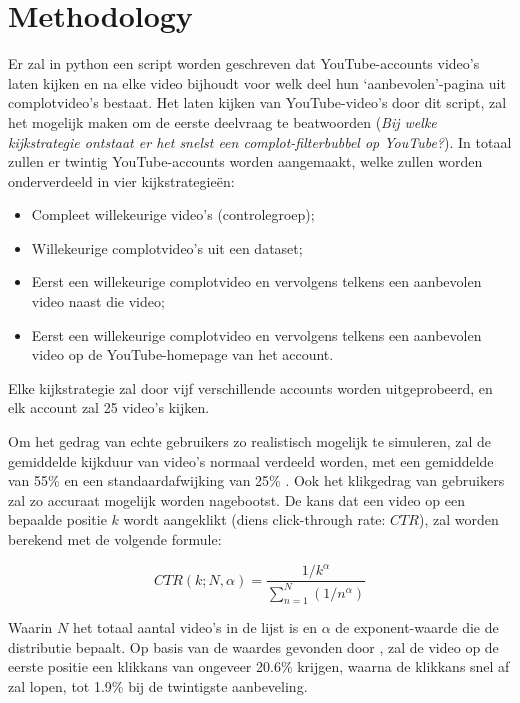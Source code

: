 \documentclass[../main.tex]{subfiles}
\begin{document}
\section{Methodology}
Er zal in python een script worden geschreven dat YouTube-accounts video’s laten kijken en na elke video bijhoudt voor welk deel hun ‘aanbevolen’-pagina uit complotvideo’s bestaat. Het laten kijken van YouTube-video's door dit script, zal het mogelijk maken om de eerste deelvraag te beatwoorden (\textit{Bij welke kijkstrategie ontstaat er het snelst een complot-filterbubbel op YouTube?}). In totaal zullen er twintig YouTube-accounts worden aangemaakt, welke zullen worden onderverdeeld in vier kijkstrategieën:

\begin{itemize}
    \item Compleet willekeurige video’s (controlegroep);
    \item Willekeurige complotvideo’s uit een dataset;
    \item Eerst een willekeurige complotvideo en vervolgens telkens een aanbevolen video naast die video;
    \item Eerst een willekeurige complotvideo en vervolgens telkens een aanbevolen video op de YouTube-homepage van het account.
\end{itemize}

\noindent Elke kijkstrategie zal door vijf verschillende accounts worden uitgeprobeerd, en elk account zal 25 video’s kijken.   

Om het gedrag van echte gebruikers zo realistisch mogelijk te simuleren, zal de gemiddelde kijkduur van video’s normaal verdeeld worden, met een gemiddelde van 55\% en een standaardafwijking van 25\% \citep{park2016data}. Ook het klikgedrag van gebruikers zal zo accuraat mogelijk worden nagebootst. De kans dat een video op een bepaalde positie $k$ wordt aangeklikt (diens click-through rate: $CTR$), zal worden berekend met de volgende formule:

\begin{equation}
CTR(k; N, \alpha) = \frac{1/k^\alpha}{\sum_{n=1}^{N} (1/n^\alpha)}
\end{equation}

\noindent Waarin $N$ het totaal aantal video's in de lijst is en $\alpha$ de exponent-waarde die de distributie bepaalt. Op basis van de waardes gevonden door \citet{zhou2010impact}, zal de video op de eerste positie een klikkans van ongeveer 20.6\% krijgen, waarna de klikkans snel af zal lopen, tot 1.9\% bij de twintigste aanbeveling. 
\end{document}
